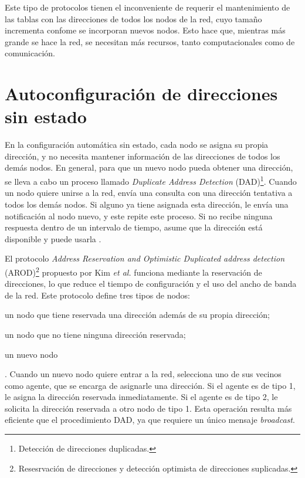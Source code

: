 Este tipo de protocolos tienen el inconveniente de requerir el mantenimiento de
las tablas con las direcciones de todos los nodos de la red, cuyo tamaño
incrementa confome se incorporan nuevos nodos. Esto hace que, mientras más
grande se hace la red, se necesitan más recursos, tanto computacionales como de
comunicación.

\section{Autoconfiguración de direcciones sin estado}

\label{sec:autoconfiguracion_de_direcciones_sin_estado}

En la configuración automática sin estado, cada nodo se asigna su propia
dirección, y no necesita mantener información de las direcciones de todos los
demás nodos. En general, para que un nuevo nodo pueda obtener una dirección, se
lleva a cabo un proceso llamado \textit{Duplicate Address Detection}
(DAD)\footnote{Detección de direcciones duplicadas.}. Cuando un nodo quiere
unirse a la red, envía una consulta con una dirección tentativa a todos los
demás nodos. Si alguno ya tiene asignada esta dirección, le envía una
notificación al nodo nuevo, y este repite este proceso. Si no recibe ninguna
respuesta dentro de un intervalo de tiempo, asume que la dirección está
disponible y puede usarla \cite{Grajzer2019}.

El protocolo \textit{Address Reservation and Optimistic Duplicated address
detection} (AROD)\footnote{Resesrvación de direcciones y detección optimista de
direcciones suplicadas.} propuesto por Kim \textit{et al.} \cite{Kim2007}
funciona mediante la reservación de direcciones, lo que reduce el tiempo de
configuración y el uso del ancho de banda de la red. Este protocolo define tres
tipos de nodos:
\begin{enumerate*}[label=\arabic*)]
  \item un nodo que tiene reservada una dirección además de su propia dirección;
  \item un nodo que no tiene ninguna dirección reservada;
  \item un nuevo nodo
\end{enumerate*}.
Cuando un nuevo nodo quiere entrar a la red, selecciona uno de sus vecinos
como agente, que se encarga de asignarle una dirección. Si el agente es de tipo
1, le asigna la dirección reservada inmediatamente. Si el agente es de tipo 2,
le solicita la dirección reservada a otro nodo de tipo 1. Esta operación
resulta más eficiente que el procedimiento DAD, ya que requiere un único
mensaje \textit{broadcast}.

